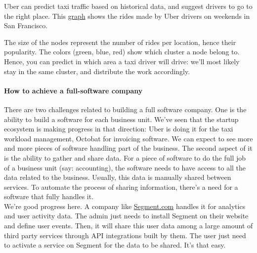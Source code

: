 \documentclass[12pt]{article}
\begin{document}
\smallskip

Uber can predict taxi traffic based on historical data, and suggest drivers to
go to the right place. This
\href{http://blogs.mathworks.com/loren/2014/09/06/analyzing-uber-ride-sharing-gps-data/}
{graph} shows the rides made by Uber drivers on weekends in San Francisco.

The size of the nodes represent the number of rides per location, hence their
popularity. The colors (green, blue, red) show which cluster a node belong to.
Hence, you can predict in which area a taxi driver will drive: we'll most likely
stay in the same cluster, and distribute the work accordingly.

\smallskip

\paragraph{How to achieve a full-software company}

There are two challenges related to building a full software company. One is the
ability to build a software for each business unit. We've seen that the startup
ecosystem is making progress in that direction: Uber is doing it for the taxi
workload management, Octobat for invoicing software. We can expect to see more
and more pieces of software handling part of the business. The second aspect of
it is the ability to gather and share data. For a piece of software to do the
full job of a business unit (say: accounting), the software needs to have access
to all the data related to the business. Usually, this data is manually shared
between services. To automate the process of sharing information, there's a need
for a software that fully handles it.\\

We're good progress here. A company like
\href{https://segment.com/}{Segment.com} handles it for analytics and user
activity data. The admin just needs to install Segment on their website and
define user events. Then, it will share this user data among a large amount of
third party services through API integrations built by them. The user just need
to activate a service on Segment for the data to be shared. It's that easy.

\smallskip
\end{document}
